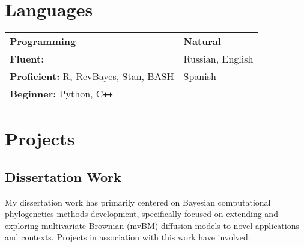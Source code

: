 \documentclass[12pt]{article}
\begin{document}
\section{Languages}

\noindent\begin{tabular}{@{}ll}
\hspace{2cm} \textbf{Programming}         & \hspace{3cm}                          \textbf{Natural}\\
\textbf{Fluent:} & \hspace{3cm} Russian, English\\
\textbf{Proficient:} R, RevBayes, Stan, BASH &  \hspace{3cm} Spanish\\
\textbf{Beginner:}  \hspace{0.035cm} Python, C\texttt{++} &  \hspace{3cm} \\

\end{tabular}

\section{Projects}

\subsection{Dissertation Work}

My dissertation work has primarily centered on Bayesian computational phylogenetics methods development, specifically focused on extending and exploring multivariate Brownian (mvBM) diffusion models to novel applications and contexts. Projects in association with this work have involved:
\end{document}
